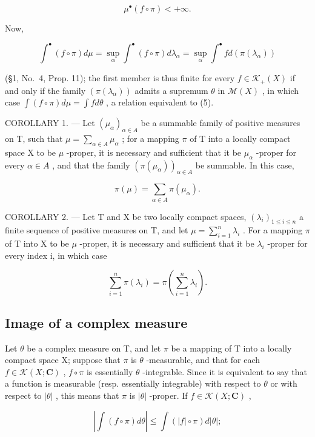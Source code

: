 \[
\mu^ {\bullet} (f \circ \pi) <   + \infty .
\]

Now,

\[
\int^ {\bullet} (f \circ \pi) d \mu = \sup _ {\alpha} \int^ {\bullet} (f \circ \pi) d \lambda_ {\alpha} = \sup _ {\alpha} \int^ {\bullet} f d (\pi (\lambda_ {\alpha}))
\]

(§1, No.~4, Prop. 11); the first member is thus finite for every \(f \in \mathcal{K}_{+}(X)\) if and only if the family \((\pi(\lambda_{\alpha}))\) admits a supremum \(\theta\) in \(\mathcal{M}(X)\) , in which case \(\int(f \circ \pi) d\mu = \int f d\theta\) , a relation equivalent to (5).

COROLLARY 1. --- Let \((\mu_{\alpha})_{\alpha \in A}\) be a summable family of positive measures on T, such that \(\mu = \sum_{\alpha \in A} \mu_{\alpha}\) ; for a mapping \(\pi\) of T into a locally compact space X to be \(\mu\) -proper, it is necessary and sufficient that it be \(\mu_{\alpha}\) -proper for every \(\alpha \in A\) , and that the family \((\pi(\mu_{\alpha}))_{\alpha \in A}\) be summable. In this case,

\[
\pi (\mu) = \sum_ {\alpha \in A} \pi (\mu_ {\alpha}).\tag{6}
\]

COROLLARY 2. --- Let T and X be two locally compact spaces, \((\lambda_{i})_{1\leqslant i\leqslant n}\) a finite sequence of positive measures on T, and let \(\mu=\sum_{i=1}^{n}\lambda_{i}\) . For a mapping \(\pi\) of T into X to be \(\mu\) -proper, it is necessary and sufficient that it be \(\lambda_{i}\) -proper for every index i, in which case

\[
\sum_ {i = 1} ^ {n} \pi (\lambda_ {i}) = \pi \left(\sum_ {i = 1} ^ {n} \lambda_ {i}\right).
\]

\subsection{Image of a complex measure}

Let \(\theta\) be a complex measure on T, and let \(\pi\) be a mapping of T into a locally compact space X; suppose that \(\pi\) is \(\theta\) -measurable, and that for each \(f \in \mathcal{K}(X; \mathbf{C})\) , \(f \circ \pi\) is essentially \(\theta\) -integrable. Since it is equivalent to say that a function is measurable (resp. essentially integrable) with respect to \(\theta\) or with respect to \(|\theta|\) , this means that \(\pi\) is \(|\theta|\) -proper. If \(f \in \mathcal{K}(X; \mathbf{C})\) ,

\[
\left| \int (f \circ \pi) d \theta \right| \leqslant \int (| f | \circ \pi) d | \theta |;\tag{7}
\]

